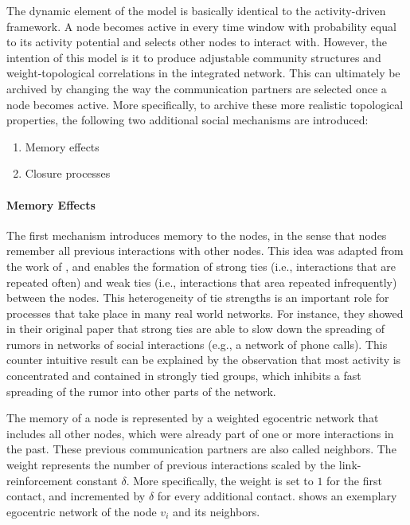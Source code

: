 The dynamic element of the model is basically identical to the activity-driven framework.
A node becomes active in every time window with probability equal to its activity potential and selects other nodes to interact with.
However, the intention of this model is it to produce adjustable community structures and weight-topological correlations in the integrated network.
This can ultimately be archived by changing the way the communication partners are selected once a node becomes active.
More specifically, to archive these more realistic topological properties, the following two additional social mechanisms are introduced:

\begin{enumerate}
    \item Memory effects
    \item Closure processes
\end{enumerate}


\paragraph{Memory Effects}
The first mechanism introduces memory to the nodes, in the sense that nodes remember all previous interactions with other nodes.
This idea was adapted from the work of \citet{Karsai2014}, and enables the formation of strong ties (i.e., interactions that are repeated often) and weak ties (i.e., interactions that area repeated infrequently) between the nodes.
This heterogeneity of tie strengths is an important role for processes that take place in many real world networks.
For instance, they showed in their original paper that strong ties are able to slow down the spreading of rumors in networks of social interactions (e.g., a network of phone calls).
This counter intuitive result can be explained by the observation that most activity is concentrated and contained in strongly tied groups, which inhibits a fast spreading of the rumor into other parts of the network.

The memory of a node is represented by a weighted egocentric network that includes all other nodes, which were already part of one or more interactions in the past.
These previous communication partners are also called neighbors.
The weight represents the number of previous interactions scaled by the link-reinforcement constant \( \delta \).
More specifically, the weight is set to \( 1 \) for the first contact, and incremented by \( \delta \) for every additional contact.
 shows an exemplary egocentric network of the node \( v_{i} \) and its neighbors.


